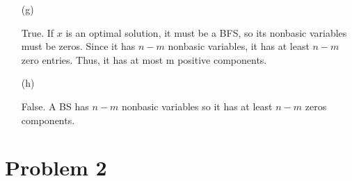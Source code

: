 \documentclass[12pt]{article}
\begin{document}
\begin{enumerate}
\item[(g)]

True. If $x$ is an optimal solution, it must be a BFS, so its nonbasic variables must be zeros. Since it has $n-m$ nonbasic variables, it has at least $n-m$ zero entries. Thus, it has at most m positive components.

\item [(h)]

False. A BS has $n-m$ nonbasic variables so it has at least $n-m$ zeros components.



\end{enumerate}

\section*{Problem 2}
\end{document}

